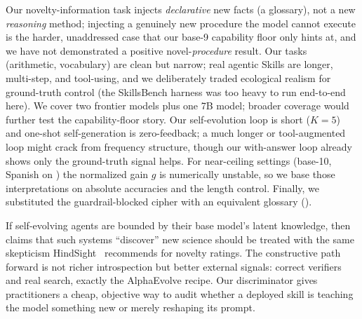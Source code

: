  Our novelty-information task injects \emph{declarative} new facts (a
glossary), not a new \emph{reasoning} method; injecting a genuinely new procedure the model
cannot execute is the harder, unaddressed case that our base-9 capability floor only hints at,
and we have not demonstrated a positive novel-\emph{procedure} result. Our tasks (arithmetic,
vocabulary) are clean but narrow; real agentic Skills are longer, multi-step, and tool-using,
and we deliberately traded ecological realism for ground-truth control (the SkillsBench harness
was too heavy to run end-to-end here). We cover two frontier models plus one 7B model; broader
coverage would further test the capability-floor story. Our self-evolution loop is short ($K=5$)
and one-shot self-generation is zero-feedback; a much longer or tool-augmented loop might crack
\zeth from frequency structure, though our with-answer loop already shows only the ground-truth
signal helps. For near-ceiling settings (base-10, Spanish on \claude) the normalized gain $g$ is
numerically unstable, so we base those interpretations on absolute accuracies and the length
control. Finally, we substituted the guardrail-blocked cipher with an equivalent glossary
().

 If self-evolving agents are bounded by their base model's latent
knowledge, then claims that such systems ``discover'' new science should be treated with the
same skepticism HindSight~\citep{hindsight} recommends for novelty ratings. The constructive
path forward is not richer introspection but better external signals: correct verifiers and real
search, exactly the AlphaEvolve recipe. Our discriminator gives practitioners a cheap, objective
way to audit whether a deployed skill is teaching the model something new or merely reshaping its
prompt.
